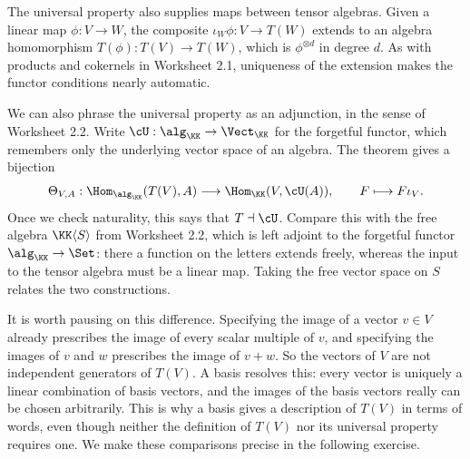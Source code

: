 \documentclass[12pt,reqno]{amsart}
\begin{document}
\hrulefill

The universal property also supplies maps between tensor algebras. Given a linear map $\phi:V\to W$, the composite $\iota_W\phi:V\to T(W)$ extends to an algebra homomorphism $T(\phi):T(V)\to T(W)$, which is $\phi^{\otimes d}$ in degree $d$. As with products and cokernels in Worksheet 2.1, uniqueness of the extension makes the functor conditions nearly automatic.

We can also phrase the universal property as an adjunction, in the sense of Worksheet 2.2. Write $\cU:\alg_{\KK}\to\Vect_{\KK}$ for the forgetful functor, which remembers only the underlying vector space of an algebra. The theorem gives a bijection
\[
\Theta_{V,A}:\Hom_{\alg_{\KK}}(T(V),A)\longrightarrow\Hom_{\KK}(V,\cU(A)),\qquad F\longmapsto F\iota_V.
\]
Once we check naturality, this says that $T\dashv\cU$. Compare this with the free algebra $\KK\langle S\rangle$ from Worksheet 2.2, which is left adjoint to the forgetful functor $\alg_{\KK}\to\Set$: there a function on the letters extends freely, whereas the input to the tensor algebra must be a linear map. Taking the free vector space on $S$ relates the two constructions.

It is worth pausing on this difference. Specifying the image of a vector $v\in V$ already prescribes the image of every scalar multiple of $v$, and specifying the images of $v$ and $w$ prescribes the image of $v+w$. So the vectors of $V$ are not independent generators of $T(V)$. A basis resolves this: every vector is uniquely a linear combination of basis vectors, and the images of the basis vectors really can be chosen arbitrarily. This is why a basis gives a description of $T(V)$ in terms of words, even though neither the definition of $T(V)$ nor its universal property requires one. We make these comparisons precise in the following exercise.

\hrulefill
\end{document}
